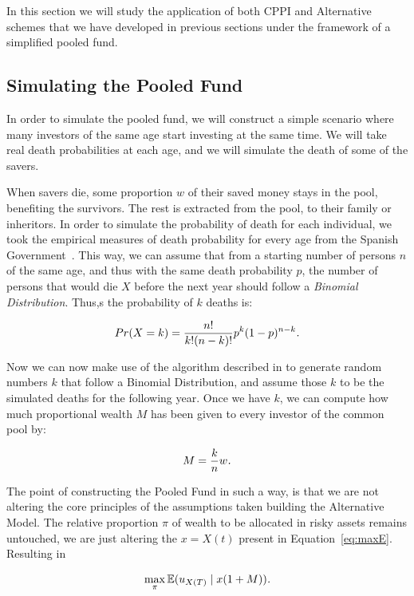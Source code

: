 In this section we will study the application of both CPPI and Alternative schemes that we have developed in previous sections under the framework of a simplified pooled fund.

\subsection{Simulating the Pooled Fund}

In order to simulate the pooled fund, we will construct a simple scenario where many investors of the same age start investing at the same time. We will take real death probabilities at each age, and we will simulate the death of some of the savers.

When savers die, some proportion $w$ of their saved money stays in the pool, benefiting the survivors. The rest is extracted from the pool, to their family or inheritors. In order to simulate the probability of death for each individual, we took the empirical measures of death probability for every age from the Spanish Government~\cite{o:mortality-table}. This way, we can assume that from a starting number of persons $n$ of the same age, and thus with the same death probability $p$, the number of persons that would die $X$ before the next year should follow a \emph{Binomial Distribution}. Thus,s the probability of $k$ deaths is:

\begin{align}
  Pr(X = k) = \frac{n!}{k!(n-k)!} p^k (1-p)^{n-k} \emph{.}
\end{align}

Now we can now make use of the algorithm described in \cite{a:schmeiser-binomial} to generate random numbers $k$ that follow a Binomial Distribution, and assume those $k$ to be the simulated deaths for the following year. Once we have $k$, we can compute how much proportional wealth $M$ has been given to every investor of the common pool by:

\begin{align}
  M = \frac{k}{n}w \emph{.}
\end{align}

The point of constructing the Pooled Fund in such a way, is that we are not altering the core principles of the assumptions taken building the Alternative Model. The relative proportion $\pi$ of wealth to be allocated in risky assets remains untouched, we are just altering the $x = X(t)$ present in  Equation~\ref{eq:maxE}. Resulting in

\begin{align}
	\max_{\pi}\EX\giventhat{u_{X(T)}}{x(1 + M)} \emph{.}
\end{align}

